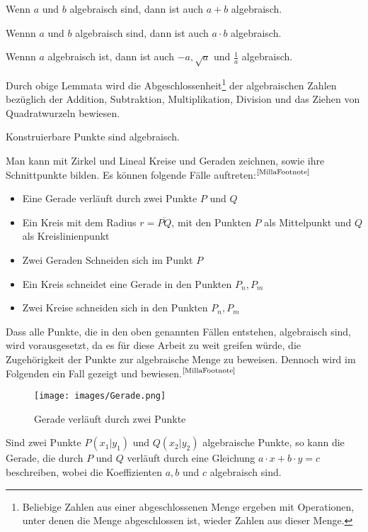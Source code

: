 \documentclass[11pt]{article}
\begin{document}
\begin{lemma}\label{addi_alge}
    Wenn \(a\) und \(b\) algebraisch sind, dann ist auch  \(a + b\) algebraisch. 
\end{lemma}
\begin{lemma}\label{multi_alge}
    Wennn \(a\) und \(b\) algebraisch sind, dann ist auch \(a \cdot b\) algebraisch.
\end{lemma}
\begin{lemma}
    Wennn \(a\) algebraisch ist, dann ist auch \(-a,\sqrt{a}\) und $\frac{1}{a}$ algebraisch.
\end{lemma} Durch obige Lemmata wird die Abgeschlossenheit\footnote{Beliebige Zahlen aus einer abgeschlossenen Menge ergeben mit Operationen, unter denen die Menge abgeschlossen ist, wieder Zahlen aus dieser Menge.} der algebraischen Zahlen bezüglich der Addition, Subtraktion, Multiplikation, Division und das Ziehen von Quadratwurzeln bewiesen.\newline
\begin{theorem}\label{konstruierbare_punkte}
    Konstruierbare Punkte sind algebraisch.
\end{theorem}Man kann mit Zirkel und Lineal Kreise und Geraden zeichnen, sowie ihre Schnittpunkte bilden. Es können folgende \glqq Fälle\grqq{} auftreten:$^\text{\ref{MillaFootnote}}$ \begin{itemize}
     \item Eine Gerade verläuft durch zwei Punkte $P$ und $Q$
     \item Ein Kreis mit dem Radius $r=\overline{PQ}$, mit den Punkten $P$ als Mittelpunkt und $Q$ als Kreislinienpunkt
     \item Zwei Geraden Schneiden sich im Punkt $P$
     \item Ein Kreis schneidet eine Gerade in den Punkten $P_n, P_m$
     \item Zwei Kreise schneiden sich in den Punkten $P_n, P_m$
 \end{itemize}
 Dass alle Punkte, die in den oben genannten Fällen entstehen, algebraisch sind, wird vorausgesetzt, da es für diese Arbeit zu weit greifen würde, die Zugehörigkeit der Punkte zur algebraische Menge zu beweisen.
Dennoch wird im Folgenden ein Fall gezeigt und bewiesen.$^\text{\ref{MillaFootnote}}$
\begin{figure}[h]
    \centering
    \texttt{[image: images/Gerade.png]}
    \caption{Gerade verläuft durch zwei Punkte}
    \label{fig:my_label}
\end{figure}
    \begin{lemma}
        Sind zwei Punkte $P(x_1|y_1)$ und $Q(x_2|y_2)$ algebraische Punkte, so kann die Gerade, die durch $P$ und $Q$ verläuft durch eine Gleichung $a\cdot x + b\cdot y=c$ beschreiben, wobei die Koeffizienten $a, b$ und $c$ algebraisch sind.
    \end{lemma}
      
\end{document}
